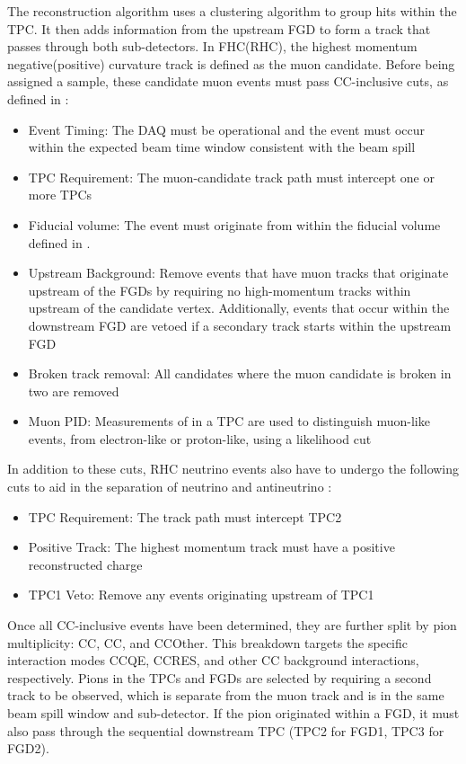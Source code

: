 The reconstruction algorithm uses a clustering algorithm to group hits within the TPC. It then adds information from the upstream FGD to form a track that passes through both sub-detectors. In FHC(RHC), the highest momentum negative(positive) curvature track is defined as the muon candidate. Before being assigned a sample, these candidate muon events must pass CC-inclusive cuts, as defined in \cite{t2k_tn_212}:

\begin{itemize}
\item Event Timing: The DAQ must be operational and the event must occur within the expected beam time window consistent with the beam spill
\item TPC Requirement: The muon-candidate track path must intercept one or more TPCs
\item Fiducial volume: The event must originate from within the fiducial volume defined in \cite{thesis_will}.
\item Upstream Background: Remove events that have muon tracks that originate upstream of the FGDs by requiring no high-momentum tracks within  upstream of the candidate vertex. Additionally, events that occur within the downstream FGD are vetoed if a secondary track starts within the upstream FGD
\item Broken track removal: All candidates where the muon candidate is broken in two are removed
\item Muon PID: Measurements of  in a TPC are used to distinguish muon-like events, from electron-like or proton-like, using a likelihood cut
\end{itemize}

In addition to these cuts, RHC neutrino events also have to undergo the following cuts to aid in the separation of neutrino and antineutrino \cite{t2k_tn_246}:

\begin{itemize}
\item TPC Requirement: The track path must intercept TPC2
\item Positive Track: The highest momentum track must have a positive reconstructed charge
\item TPC1 Veto: Remove any events originating upstream of TPC1
\end{itemize}

Once all CC-inclusive events have been determined, they are further split by pion multiplicity: CC\quickmath{0\pi}, CC\quickmath{1\pi}, and CCOther. This breakdown targets the specific interaction modes CCQE, CCRES, and other CC background interactions, respectively. Pions in the TPCs and FGDs are selected by requiring a second track to be observed, which is separate from the muon track and is in the same beam spill window and sub-detector. If the pion originated within a FGD, it must also pass through the sequential downstream TPC (TPC2 for FGD1, TPC3 for FGD2). 

